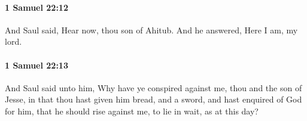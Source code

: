 		\paragraph{1 Samuel 22:12} %
			\label{1SAMUEL-22-12}

			And Saul said, Hear now, thou son of Ahitub. And he answered, Here I am, my lord.


		\paragraph{1 Samuel 22:13} %
			\label{1SAMUEL-22-13}

			And Saul said unto him, Why have ye conspired against me, thou and the son of Jesse, in that thou hast given him bread, and a sword, and hast enquired of God for him, that he should rise against me, to lie in wait, as at this day?


